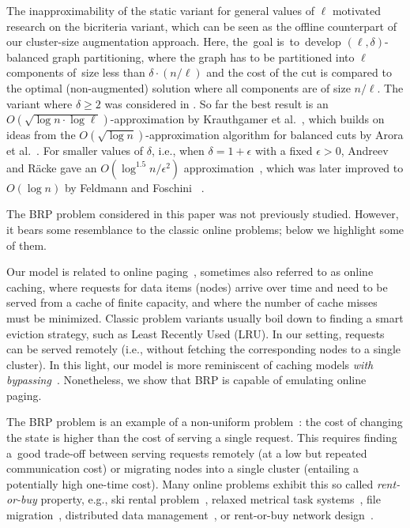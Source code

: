 \documentclass{siamart190516}
\newcommand{\eps}{\ensuremath{\epsilon}}
\begin{document}
The inapproximability of the static variant for general values of $\ell$
motivated research on the bicriteria variant, which can be seen as the offline
counterpart of our cluster-size augmentation approach. Here, the~goal
is~to~develop $(\ell,\delta)$-balanced graph partitioning, where the graph has
to be partitioned into $\ell$ components of~size less than $\delta \cdot (n /
\ell)$ and the cost of the cut is compared to the optimal (non-augmented)
solution where all components are of size $n / \ell$. The variant where
$\delta \geq 2$ was considered in
\cite{LeMaTr90,SimTen97,EvNaRS00,EvNaRS99,KrNaSc09}. So far the best result is
an $O(\!\sqrt{\log n \cdot \log \ell})$-approximation by Krauthgamer et
al.~\cite{KrNaSc09}, which builds on ideas from the $O(\!\sqrt{\log
n})$-approximation algorithm for balanced cuts by Arora et al.~\cite{ArRaVa09}.
For smaller values of $\delta$, i.e., when $\delta = 1 + \eps$ with a fixed
$\eps > 0$, Andreev and R{\"{a}}cke gave an $O(\log^{1.5} n / \eps^2)$
approximation~\cite{AndRae06}, which was later improved to $O(\log n)$ by
Feldmann and Foschini ~\cite{FelFos15}.

The BRP problem considered in this paper was not previously studied. However,
it bears some resemblance to the classic online problems; below we highlight
some of them.

Our model is related to online
paging~\cite{SleTar85,FKLMSY91,McGSle91,AcChNo00}, sometimes also referred to
as online caching, where requests for data items (nodes) arrive over time and
need to be served from a cache of finite capacity, and where the number of
cache misses must be minimized. Classic problem variants usually boil down to
finding a smart eviction strategy, such as Least Recently Used (LRU). In our
setting, requests can be served remotely (i.e., without fetching the
corresponding nodes to a single cluster). In this light, our model is more
reminiscent of caching models \emph{with
bypassing}~\cite{EpImLN11,EpImLN15,Irani02}. Nonetheless, we show that BRP is
capable of emulating online paging.

The BRP problem is an example of a non-uniform problem~\cite{KaMaMO94}: the
cost of changing the state is higher than the cost of serving a single
request. This requires finding a~good trade-off between serving requests
remotely (at a low but repeated communication cost) or migrating nodes into a
single cluster (entailing a potentially high one-time cost). Many
online problems exhibit this so called \emph{rent-or-buy} property, e.g., ski
rental problem~\cite{KaMaMO94,LoPaRa08}, relaxed metrical task
systems~\cite{BaChIn01}, file migration~\cite{BaChIn01,BiByMu17}, distributed
data management~\cite{BaFiRa95,AwBaFi93,AwBaFi98}, or rent-or-buy network
design~\cite{AwAzBa04,Umboh15,FeWiLe16}.
\end{document}
